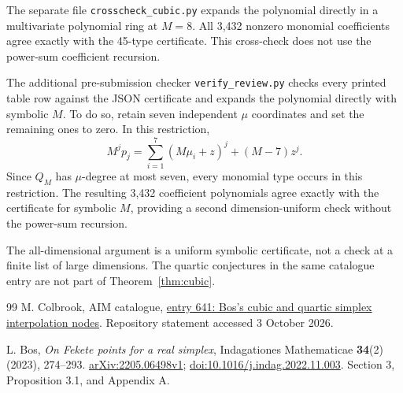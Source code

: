 \documentclass[11pt,a4paper]{article}
\theoremstyle{remark}
\begin{document}
The separate file \texttt{crosscheck\_cubic.py} expands the polynomial directly in a multivariate polynomial ring at $M=8$. All 3,432 nonzero monomial coefficients agree exactly with the 45-type certificate. This cross-check does not use the power-sum coefficient recursion.

The additional pre-submission checker \texttt{verify\_review.py} checks every printed table row against the JSON certificate and expands the polynomial directly with symbolic $M$. To do so, retain seven independent $\mu$ coordinates and set the remaining ones to zero. In this restriction,
\[
 M^j p_j=\sum_{i=1}^7(M\mu_i+z)^j+(M-7)z^j.
\]
Since $Q_M$ has $\mu$-degree at most seven, every monomial type occurs in this restriction. The resulting 3,432 coefficient polynomials agree exactly with the certificate for symbolic $M$, providing a second dimension-uniform check without the power-sum recursion.

The all-dimensional argument is a uniform symbolic certificate, not a check at a finite list of large dimensions. The quartic conjectures in the same catalogue entry are not part of Theorem~\ref{thm:cubic}.


\begin{thebibliography}{99}
M. Colbrook, AIM catalogue, \href{https://github.com/MColbrook/AIM/blob/59a8f0c2957dd272f56bcf282dfe0c066a15f441/problems/641-bos-simplex-interpolation-nodes.md}{entry 641: Bos's cubic and quartic simplex interpolation nodes}. Repository statement accessed 3 October 2026.


L. Bos, \emph{On Fekete points for a real simplex}, Indagationes Mathematicae \textbf{34}(2) (2023), 274--293. \href{https://arxiv.org/abs/2205.06498v1}{arXiv:2205.06498v1}; \href{https://doi.org/10.1016/j.indag.2022.11.003}{doi:10.1016/j.indag.2022.11.003}. Section 3, Proposition 3.1, and Appendix A.

\end{thebibliography}
\end{document}
